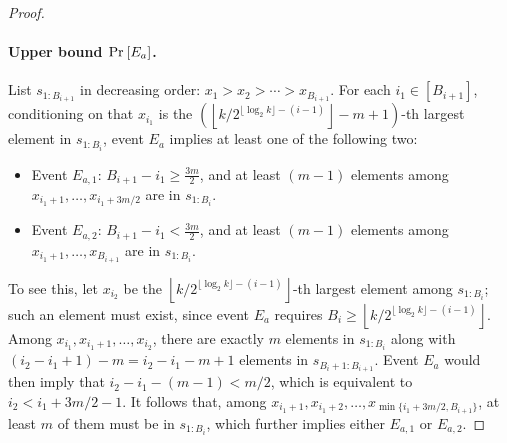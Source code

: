 \begin{proof}
\paragraph{Upper bound $\Pr_{}\left[E_a\right]$.}
List $s_{1:B_{i+1}}$ in decreasing order:  $x_1> x_2 > \cdots> x_{B_{i+1}}$. For each $i_1 \in [B_{i+1}]$, conditioning on that $x_{i_1}$ is the $\left(\left\lfloor k/2^{\lfloor\log_2 k\rfloor - (i-1)}\right\rfloor - m+1\right)$-th largest element in $s_{1:B_i}$, event $E_a$ implies at least one of the following two:
\begin{itemize}
    \item Event $E_{a,1}$: $B_{i+1} - i_1 \ge \frac{3m}{2}$, and at least $(m-1)$ elements among $ x_{i_1 + 1}, \ldots, x_{i_1 + 3m/2}$ are in $s_{1:B_i}$.
    \item Event $E_{a,2}$: $B_{i+1} - i_1 < \frac{3m}{2}$, and at least $(m-1)$ elements among $ x_{i_1 + 1}, \ldots, x_{B_{i+1}}$ are in $s_{1:B_i}$.
\end{itemize}
To see this, let $x_{i_2}$ be the $\left\lfloor k/2^{\lfloor\log_2 k\rfloor - (i-1)}\right\rfloor$-th largest element among $s_{1:B_i}$; such an element must exist, since event $E_a$ requires $B_i \ge \left\lfloor k/2^{\lfloor\log_2 k\rfloor - (i-1)}\right\rfloor$. Among $x_{i_1}, x_{i_1 + 1}, \ldots, x_{i_2}$, there are exactly $m$ elements in $s_{1:B_i}$ along with $(i_2 - i_1 + 1) - m = i_2 - i_1 - m+1$ elements in $s_{B_i + 1: B_{i+1}}$. Event $E_a$ would then imply that $i_2 - i_1 - (m-1) < m/2$, which is equivalent to $i_2 < i_1 + 3m/2-1$. It follows that, among $x_{i_1 + 1}, x_{i_1 + 2}, \ldots, x_{\min\{i_1 + 3m/2, B_{i+1}\}}$, at least $m$ of them must be in $s_{1:B_i}$, which further implies either $E_{a,1}$ or $E_{a,2}$.


\end{proof}
